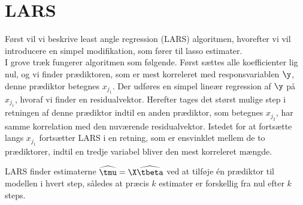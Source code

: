 \section{LARS}
Først vil vi beskrive least angle regression (LARS) algoritmen, hvorefter vi vil introducere en simpel modifikation, som fører til lasso estimater. \\[2mm]
%
I grove træk fungerer algoritmen som følgende. 
Først sættes alle koefficienter lig nul, og vi finder prædiktoren, som er mest korreleret med responsvariablen \(\y\), denne prædiktor betegnes \(x_{j_1}\).
Der udføres en simpel lineær regression af \(\y\) på \(x_{j_1}\), hvoraf vi finder en residualvektor.
Herefter tages det størst mulige step i retningen af denne prædiktor indtil en anden prædiktor, som betegnes \(x_{j_2}\), har samme korrelation med den nuværende residualvektor.
Istedet for at fortsætte langs \(x_{j_1}\) fortsætter LARS i en retning, som er ensvinklet mellem de to prædiktorer, indtil en tredje variabel bliver den mest korreleret mængde.

LARS finder estimaterne \(\widehat{\tmu} = \X \widehat{\tbeta}\) ved at tilføje én prædiktor til modellen i hvert step, således at præcis \(k\) estimater er forskellig fra nul efter \(k\) steps.

